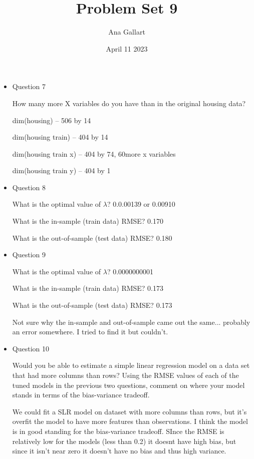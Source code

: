 \documentclass{article}
\title{Problem Set 9}
\author{Ana Gallart}
\date{April 11 2023}
\begin{document}
\maketitle

\begin{itemize}
    \item {Question 7}  
    
How many more X variables do you have than in the original housing data? 

dim(housing) -- 506 by 14

dim(housing train) -- 404 by 14

dim(housing train x) -- 404 by 74, 60more x variables 

dim(housing train y) -- 404 by 1

\item{Question 8}

What is the optimal value of $\lambda$? 0.0.00139 or 0.00910

What is the in-sample (train data) RMSE? 0.170

What is the out-of-sample (test data) RMSE? 0.180

\item{Question 9}

What is the optimal value of $\lambda$? 0.0000000001

What is the in-sample (train data) RMSE? 0.173

What is the out-of-sample (test data) RMSE? 0.173

Not sure why the in-sample and out-of-sample came out the same... probably an error somewhere. I tried to find it but couldn't.

\item{Question 10}

Would you be
able to estimate a simple linear regression model on a data set that had more columns
than rows? Using the RMSE values of each of the tuned models in the previous two questions, comment on where your model stands in terms of the bias-variance tradeoff.

We could fit a SLR model on dataset with more columns than rows, but it's overfit the model to have more features than observations. I think the model is in good standing for the bias-variance tradeoff. SInce the RMSE is relatively low for the models (less than 0.2) it doesnt have high bias, but since it isn't near zero it doesn't have no bias and thus high variance. 

\end{itemize}
\end{document}
